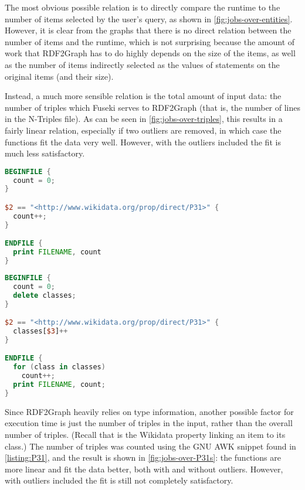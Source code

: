 The most obvious possible relation is
to directly compare the runtime to the number of \glspl{item} selected by the user’s query,
as shown in \cref{fig:jobs-over-entities}.
However, it is clear from the graphs that there is no direct relation
between the number of \glspl{item} and the runtime,
which is not surprising because the amount of work that \gls{RDF2Graph} has to do
highly depends on the size of the \glspl{item},
as well as the number of \glspl{item} indirectly selected as the values of \glspl{statement} on the original \glspl{item} (and their size).

Instead, a much more sensible relation is the total amount of input data:
the number of \glspl{triple} which Fuseki serves to \gls{RDF2Graph}
(that is, the number of lines in the N-Triples file). %
As can be seen in \cref{fig:jobs-over-triples},
this results in a fairly linear relation,
especially if two outliers are removed,
in which case the functions fit the data very well.
However, with the outliers included the fit is much less satisfactory.

\begin{lstfloat}[b]
\begin{lstlisting}[language=awk]
BEGINFILE {
  count = 0;
}

$2 == "<http://www.wikidata.org/prop/direct/P31>" {
  count++;
}

ENDFILE {
  print FILENAME, count
}
\end{lstlisting}
\caption{GNU AWK script to count the number of  triples in the input.}
\label{listing:P31}
\end{lstfloat}

\begin{lstfloat}[b]
\begin{lstlisting}[language=awk]
BEGINFILE {
  count = 0;
  delete classes;
}

$2 == "<http://www.wikidata.org/prop/direct/P31>" {
  classes[$3]++
}

ENDFILE {
  for (class in classes)
    count++;
  print FILENAME, count;
}
\end{lstlisting}
\caption{GNU AWK script to count distinct classes in the input.}
\label{listing:classes}
\end{lstfloat}

Since \gls{RDF2Graph} heavily relies on type information,
another possible factor for execution time
is just the number of  \glspl{triple} in the input,
rather than the overall number of \glspl{triple}.
(Recall that  is the \gls{Wikidata} property linking an \gls{item} to its class.)
The number of  \glspl{triple} was counted
using the GNU AWK snippet found in \cref{listing:P31},
and the result is shown in \cref{fig:jobs-over-P31s}:
the functions are more linear and fit the data better, both with and without outliers.
However, with outliers included the fit is still not completely satisfactory.

